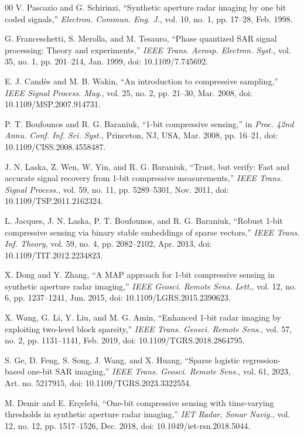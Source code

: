 \documentclass[conference]{IEEEtran}
\begin{document}
\begin{thebibliography}{00}
V. Pascazio and G. Schirinzi, ``Synthetic aperture radar imaging by one bit coded signals,'' \textit{Electron. Commun. Eng. J.}, vol. 10, no. 1, pp. 17--28, Feb. 1998.

G. Franceschetti, S. Merolla, and M. Tesauro, ``Phase quantized SAR signal processing: Theory and experiments,'' \textit{IEEE Trans. Aerosp. Electron. Syst.}, vol. 35, no. 1, pp. 201--214, Jan. 1999, doi: 10.1109/7.745692.

E. J. Cand\`es and M. B. Wakin, ``An introduction to compressive sampling,'' \textit{IEEE Signal Process. Mag.}, vol. 25, no. 2, pp. 21--30, Mar. 2008, doi: 10.1109/MSP.2007.914731.

P. T. Boufounos and R. G. Baraniuk, ``1-bit compressive sensing,'' in \textit{Proc. 42nd Annu. Conf. Inf. Sci. Syst.}, Princeton, NJ, USA, Mar. 2008, pp. 16--21, doi: 10.1109/CISS.2008.4558487.

J. N. Laska, Z. Wen, W. Yin, and R. G. Baraniuk, ``Trust, but verify: Fast and accurate signal recovery from 1-bit compressive measurements,'' \textit{IEEE Trans. Signal Process.}, vol. 59, no. 11, pp. 5289--5301, Nov. 2011, doi: 10.1109/TSP.2011.2162324.

L. Jacques, J. N. Laska, P. T. Boufounos, and R. G. Baraniuk, ``Robust 1-bit compressive sensing via binary stable embeddings of sparse vectors,'' \textit{IEEE Trans. Inf. Theory}, vol. 59, no. 4, pp. 2082--2102, Apr. 2013, doi: 10.1109/TIT.2012.2234823.

X. Dong and Y. Zhang, ``A MAP approach for 1-bit compressive sensing in synthetic aperture radar imaging,'' \textit{IEEE Geosci. Remote Sens. Lett.}, vol. 12, no. 6, pp. 1237--1241, Jun. 2015, doi: 10.1109/LGRS.2015.2390623.

X. Wang, G. Li, Y. Liu, and M. G. Amin, ``Enhanced 1-bit radar imaging by exploiting two-level block sparsity,'' \textit{IEEE Trans. Geosci. Remote Sens.}, vol. 57, no. 2, pp. 1131--1141, Feb. 2019, doi: 10.1109/TGRS.2018.2864795.

S. Ge, D. Feng, S. Song, J. Wang, and X. Huang, ``Sparse logistic regression-based one-bit SAR imaging,'' \textit{IEEE Trans. Geosci. Remote Sens.}, vol. 61, 2023, Art. no. 5217915, doi: 10.1109/TGRS.2023.3322554.

M. Demir and E. Er\c{c}elebi, ``One-bit compressive sensing with time-varying thresholds in synthetic aperture radar imaging,'' \textit{IET Radar, Sonar Navig.}, vol. 12, no. 12, pp. 1517--1526, Dec. 2018, doi: 10.1049/iet-rsn.2018.5044.


\end{thebibliography}
\end{document}
